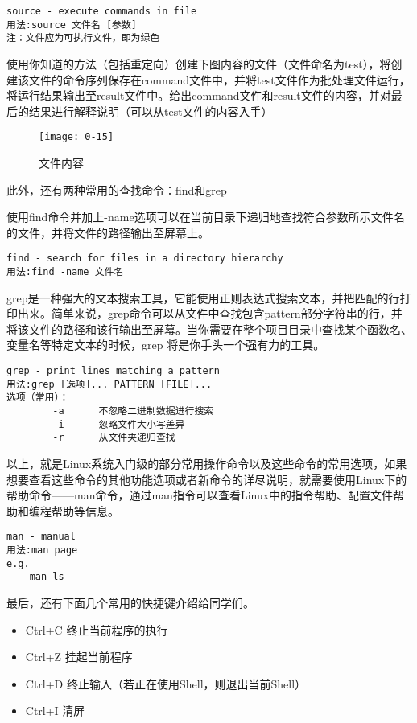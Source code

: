 \begin{verbatim}
source - execute commands in file
用法:source 文件名 [参数]
注：文件应为可执行文件，即为绿色
\end{verbatim}

\begin{thinking}\label{think-文件的操作}
使用你知道的方法（包括重定向）创建下图内容的文件（文件命名为test），将创建该文件的命令序列保存在command文件中，并将test文件作为批处理文件运行，将运行结果输出至result文件中。给出command文件和result文件的内容，并对最后的结果进行解释说明（可以从test文件的内容入手）
\end{thinking}
\begin{figure}[htbp]
	\centering
	\texttt{[image: 0-15]}
	\caption{文件内容}\label{fig:0-15}
\end{figure}

此外，还有两种常用的查找命令：find和grep

使用find命令并加上-name选项可以在当前目录下递归地查找符合参数所示文件名的文件，并将文件的路径输出至屏幕上。

\begin{verbatim}
find - search for files in a directory hierarchy
用法:find -name 文件名
\end{verbatim}

grep是一种强大的文本搜索工具，它能使用正则表达式搜索文本，并把匹配的行打印出来。简单来说，grep命令可以从文件中查找包含pattern部分字符串的行，并将该文件的路径和该行输出至屏幕。当你需要在整个项目目录中查找某个函数名、变量名等特定文本的时候，grep 将是你手头一个强有力的工具。

\begin{verbatim}
grep - print lines matching a pattern
用法:grep [选项]... PATTERN [FILE]...
选项（常用）：
		-a		不忽略二进制数据进行搜索
		-i		忽略文件大小写差异
		-r		从文件夹递归查找
\end{verbatim}

以上，就是Linux系统入门级的部分常用操作命令以及这些命令的常用选项，如果想要查看这些命令的其他功能选项或者新命令的详尽说明，就需要使用Linux下的帮助命令——man命令，通过man指令可以查看Linux中的指令帮助、配置文件帮助和编程帮助等信息。

\begin{verbatim}
man - manual
用法:man page
e.g.
	man ls
\end{verbatim}

最后，还有下面几个常用的快捷键介绍给同学们。
\begin{itemize}
    \item Ctrl+C	终止当前程序的执行
	\item Ctrl+Z	挂起当前程序
	\item Ctrl+D	终止输入（若正在使用Shell，则退出当前Shell）
	\item Ctrl+I	清屏
\end{itemize}


